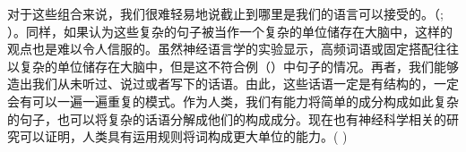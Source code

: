 对于这些组合来说，我们很难轻易地说截止到哪里是我们的语言可以接受的。（\citealp[]{Harris57a}; \citealp[]{Chomsky57a}）。同样，如果认为这些复杂的句子被当作一个复杂的单位储存在大脑中，这样的观点也是难以令人信服的。虽然神经语言学的实验显示，高频词语或固定搭配往往以复杂的单位储存在大脑中，但是这不符合例（）中句子的情况。再者，我们能够造出我们从未听过、说过或者写下的话语。由此，这些话语一定是有结构的，一定会有可以一遍一遍重复的模式。作为人类，我们有能力将简单的成分构成如此复杂的句子，也可以将复杂的话语分解成他们的构成成分。现在也有神经科学相关的研究可以证明，人类具有运用规则将词构成更大单位的能力。( \citep[]{Pulvermueller2010a})

